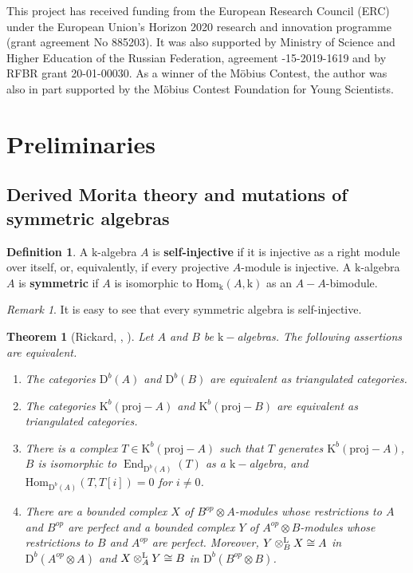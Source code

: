 \documentclass[12pt]{amsart}
\theoremstyle{plain}
\newtheorem{theorem}{Theorem}%
\theoremstyle{remark}
\newtheorem*{remark}{Remark}
\theoremstyle{definition}
\newtheorem{definition}{Definition}[section]
\newcommand{\End}{\mathop{\mathrm{End}}\nolimits}
\newcommand{\proj}{{\mathrm{proj}}}
\newcommand{\Hom}{{\mathrm{Hom}}}
\newcommand{\D}{{\mathrm{D}}}
\newcommand{\K}{{\mathrm{K}}}
\newcommand{\Li}{{\mathrm{L}}}
\def\kk{\mathrm{k}}
\begin{document}
This project has received funding from the European Research Council (ERC) under the European Union's Horizon 2020 research and innovation programme (grant agreement No 885203).  It was also supported by Ministry of Science and Higher Education of the Russian Federation, agreement -15-2019-1619 and by RFBR grant 20-01-00030. As a winner of the M\"{o}bius Contest, the author was also in part supported by the M\"{o}bius Contest Foundation for Young Scientists. 

\section{Preliminaries}\label{sec:prelim} 

\subsection{Derived Morita theory and mutations of symmetric algebras}


\begin{definition} A $\kk$-algebra $A$ is {\bf self-injective} if it is injective as a right module over itself, or, equivalently, if every
projective $A$-module is injective.  A $\kk$-algebra $A$ is {\bf symmetric} if $A$ is isomorphic to $\Hom_\kk(A,\kk)$ as an $A-A$-bimodule. \end{definition}

\begin{remark}  It is easy to see that every symmetric algebra is self-injective.  \end{remark}

\begin{theorem}[Rickard, \cite{R}, \cite{R2}]\label{thm:R}
Let $A$ and $B$ be $\kk-$algebras. The following assertions are equivalent. 
\begin{enumerate}
    \item The categories $\D^b(A)$ and $\D^b(B)$ are equivalent as triangulated categories. 
    \item The categories $\K^b(\proj-A)$ and $\K^b(\proj-B)$ are equivalent as triangulated categories. 
    \item There is a complex $T \in \K^b(\proj-A)$ such that $T$ generates $\K^b(\proj-A)$, $B$ is isomorphic to $\End_{\D^b(A)}(T) $ as a $\kk-$algebra, and $\Hom_{\D^b(A)}(T,T[i]) = 0$ for $i\neq 0$. 
    \item There are a bounded complex $X$ of $B^{op} \otimes A$-modules whose restrictions to $A$ and $B^{op}$ are perfect and a bounded complex $Y$ of $A^{op} \otimes B$-modules whose restrictions to $B$ and $A^{op}$ are perfect. Moreover, $Y \otimes_B^{{\bf \Li}}X  \cong A$ in $\D^b(A^{op} \otimes A)$ and $X\otimes_A^{{\bf \Li}} Y \cong B$ in $\D^b(B^{op} \otimes B)$. 
\end{enumerate}
\end{theorem}
\end{document}
